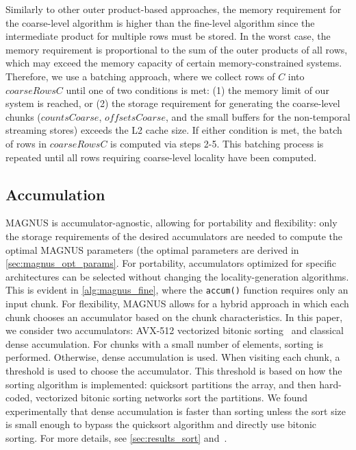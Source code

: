 Similarly to other outer product-based approaches, the memory requirement for the coarse-level algorithm is higher than the fine-level algorithm since the intermediate product for multiple rows must be stored.
In the worst case, the memory requirement is proportional to the sum of the outer products of all rows, which may exceed the memory capacity of certain memory-constrained systems.
Therefore, we use a batching approach, where we collect rows of $C$ into $coarseRowsC$ until one of two conditions is met:
(1) the memory limit of our system is reached, or (2) the storage requirement for generating the coarse-level chunks ($countsCoarse$, $offsetsCoarse$, and the small buffers for the non-temporal streaming stores) exceeds the L2 cache size.
If either condition is met, the batch of rows in $coarseRowsC$ is computed via steps 2-5.
This batching process is repeated until all rows requiring coarse-level locality have been computed.

\subsection{Accumulation}\label{sec:magnus_accum}
MAGNUS is accumulator-agnostic, allowing for portability and flexibility: only the storage requirements of the desired accumulators
are needed to compute the optimal MAGNUS parameters (the optimal parameters are derived in \autoref{sec:magnus_opt_params}.
For portability, accumulators optimized for specific architectures can be selected without changing the locality-generation algorithms.
This is evident in \autoref{alg:magnus_fine}, where the \texttt{accum()} function requires only an input chunk.
For flexibility, MAGNUS allows for a hybrid approach in which each chunk chooses an accumulator based on the chunk characteristics.
In this paper, we consider two accumulators: AVX-512 vectorized bitonic sorting~\cite{AVX512sort} and classical dense accumulation.
For chunks with a small number of elements, sorting is performed. Otherwise, dense accumulation is used.
When visiting each chunk, a threshold is used to choose the accumulator.
This threshold is based on how the sorting algorithm is implemented: quicksort partitions the array, and then hard-coded, vectorized bitonic sorting networks sort the partitions.
We found experimentally that dense accumulation is faster than sorting unless the sort size is small enough to bypass the quicksort algorithm and directly use bitonic sorting.
For more details, see \autoref{sec:results_sort} and~\cite{AVX512sort}.

